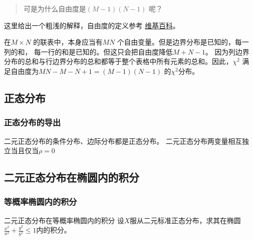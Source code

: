 \begin{quote}
    可是为什么自由度是\((M-1)(N-1)\) 呢？
\end{quote}

这里给出一个粗浅的解释，自由度的定义参考
\href{https://en.wikipedia.org/wiki/Degrees_of_freedom_(statistics)#Example}{维基百科}。

在\(M \times N\) 的联表中，本身应当有\(MN\) 个自由变量。但是边界分布是已知的，每一列的和，
每一行的和是已知的。但这只会把自由度降低\(M+N-1\)。
因为列边界分布的总和与行边界分布的总和都等于整个表格中所有元素的总和。因此，\(\chi^{2}\)
满足自由度为\(MN-M-N+1 = (M-1)(N-1)\) 的\(\chi^{2}\)分布。


\subsection{正态分布}

\subsubsection{正态分布的导出}
二元正态分布的条件分布、边际分布都是正态分布。
二元正态分布两变量相互独立当且仅当\(\rho=0\)


\subsection{二元正态分布在椭圆内的积分}

\subsubsection{等概率椭圆内的积分}

\begin{problem}{二元正态分布在等概率椭圆内的积分}
    设\(X\)服从二元标准正态分布，求其在椭圆\(\frac{x^{2}}{a^{2}} +
    \frac{y^{2}}{b^{2}} \leq 1\)内的积分。
\end{problem}

